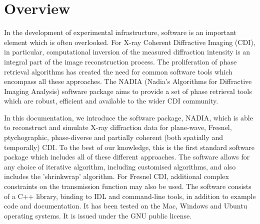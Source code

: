 \documentclass[]{cxs-software}
\begin{document}




\section{Overview}

In the development of experimental infrastructure, software is an
important element which is often overlooked. For X-ray Coherent
Diffractive Imaging (CDI), in particular, computational inversion of
the measured diffraction intensity is an integral part of the image
reconstruction process. The proliferation of phase retrieval
algorithms has created the need for common software tools which
encompass all these approaches. The NADIA (Nadia's Algorithms for 
Diffractive Imaging Analysis) software package aims to provide a set of phase
retrieval tools which are robust, efficient and available to the wider
CDI community.

In this documentation, we introduce the software package, NADIA, 
which is able to reconstruct and simulate
X-ray diffraction data for plane-wave, Fresnel, ptychographic,
phase-diverse and partially coherent (both spatially and temporally) 
CDI. To the best of our knowledge, this is the first
standard software package which includes all of these different
approaches. The software allows for any choice of iterative algorithm,
including customised algorithms, and also includes the 'shrinkwrap'
algorithm. For Fresnel CDI, additional complex constraints on the
transmission function may also be used. The software consists of a C++
library, binding to IDL and command-line tools, in addition to example
code and documentation. It has been tested on the Mac, Windows and
Ubuntu operating systems. It is issued under the GNU public license.
\end{document}
